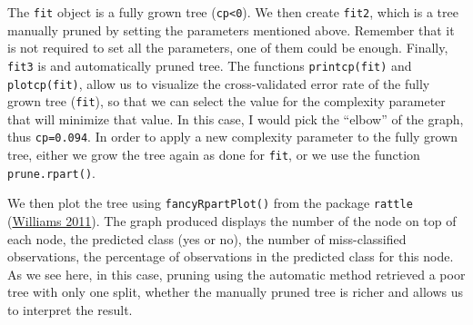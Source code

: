 \documentclass[
]{article}
\begin{document}
The \texttt{fit} object is a fully grown tree (\texttt{cp\textless{}0}). We then create \texttt{fit2},
which is a tree manually pruned by setting the parameters mentioned
above. Remember that it is not required to set all the parameters, one
of them could be enough. Finally, \texttt{fit3} is and automatically pruned
tree. The functions \texttt{printcp(fit)} and \texttt{plotcp(fit)}, allow us to
visualize the cross-validated error rate of the fully grown tree
(\texttt{fit}), so that we can select the value for the complexity parameter
that will minimize that value. In this case, I would pick the ``elbow'' of
the graph, thus \texttt{cp=0.094}. In order to apply a new complexity parameter
to the fully grown tree, either we grow the tree again as done for
\texttt{fit}, or we use the function \texttt{prune.rpart()}.

We then plot the tree using \texttt{fancyRpartPlot()} from the package \texttt{rattle}
(\protect\hyperlink{ref-williams2011}{Williams 2011}). The graph produced displays the number of the node on
top of each node, the predicted class (yes or no), the number of
miss-classified observations, the percentage of observations in the
predicted class for this node. As we see here, in this case, pruning
using the automatic method retrieved a poor tree with only one split,
whether the manually pruned tree is richer and allows us to interpret
the result.
\end{document}

